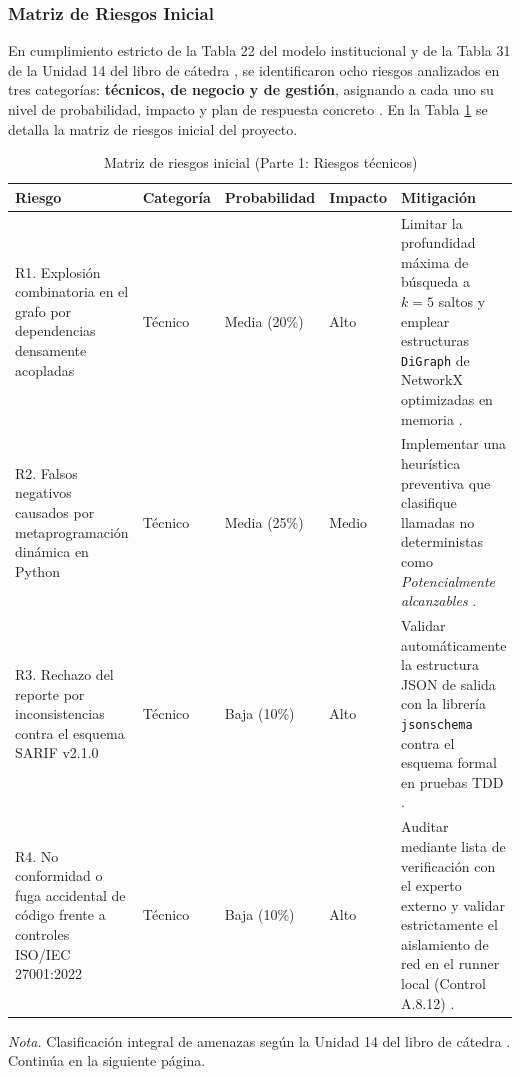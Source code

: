 \subsubsection{Matriz de Riesgos Inicial}
En cumplimiento estricto de la Tabla 22 del modelo institucional y de la Tabla 31 de la Unidad 14 del libro de cátedra \parencite{torres2026proyecto}, se identificaron ocho riesgos analizados en tres categorías: \textbf{técnicos, de negocio y de gestión}, asignando a cada uno su nivel de probabilidad, impacto y plan de respuesta concreto \parencite{pmi2021pmbok, torres2026proyecto}. %
En la Tabla \ref{tab:matriz_riesgos_inicial} se detalla la matriz de riesgos inicial del proyecto. %

\begin{table}[H]
\centering
\caption{Matriz de riesgos inicial (Parte 1: Riesgos técnicos)}
\label{tab:matriz_riesgos_inicial}
\small
{}
\begin{tabularx}{\textwidth}{>{\raggedright\arraybackslash}p{4.4cm} >{\centering\arraybackslash}p{2.0cm} >{\centering\arraybackslash}p{2.3cm} >{\centering\arraybackslash}p{1.8cm} X}
\toprule
\textbf{Riesgo} & \textbf{Categoría} & \textbf{Probabilidad} & \textbf{Impacto} & \textbf{Mitigación} \\
\midrule
R1. Explosión combinatoria en el grafo por dependencias densamente acopladas & 
Técnico & 
Media (20\%) & 
Alto & 
Limitar la profundidad máxima de búsqueda a $k=5$ saltos y emplear estructuras \texttt{DiGraph} de NetworkX optimizadas en memoria \parencite{hagberg2008exploring}. \\
\addlinespace
R2. Falsos negativos causados por metaprogramación dinámica en Python & 
Técnico & 
Media (25\%) & 
Medio & 
Implementar una heurística preventiva que clasifique llamadas no deterministas como \textit{Potencialmente alcanzables} \parencite{salis2021pycg}. \\
\addlinespace
R3. Rechazo del reporte por inconsistencias contra el esquema SARIF v2.1.0 & 
Técnico & 
Baja (10\%) & 
Alto & 
Validar automáticamente la estructura JSON de salida con la librería \texttt{jsonschema} contra el esquema formal en pruebas TDD \parencite{oasis2019sarif}. \\
\addlinespace
R4. No conformidad o fuga accidental de código frente a controles ISO/IEC 27001:2022 & 
Técnico & 
Baja (10\%) & 
Alto & 
Auditar mediante lista de verificación con el experto externo y validar estrictamente el aislamiento de red en el runner local (Control A.8.12) \parencite{gutierrez2024auditoria}. \\
\bottomrule
\end{tabularx}
\vspace{2pt}
\begin{flushleft}
\scriptsize \textit{Nota.} Clasificación integral de amenazas según la Unidad 14 del libro de cátedra \parencite{torres2026proyecto}. Continúa en la siguiente página.
\end{flushleft}
\end{table}

